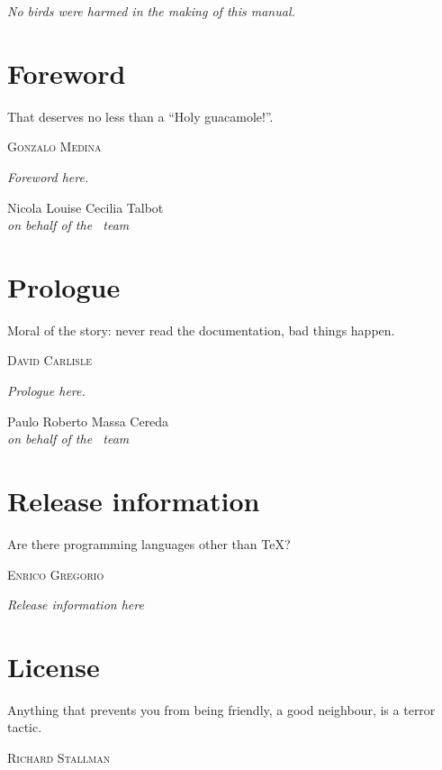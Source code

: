 \documentclass[a4paper,twoside,12pt]{memoir}
\begin{document}
\vspace*{25em}

\begin{flushright}
\em No birds were harmed in the making of this manual.
\end{flushright}

\chapter*{Foreword}
\label{chap:foreword}

\epigraph{That deserves no less than a ``Holy guacamole!''.}{\textsc{Gonzalo Medina}}

\emph{Foreword here.}

\vfill

\begin{flushright}
Nicola Louise Cecilia Talbot\\
\emph{on behalf of the \arara\ team}
\end{flushright}

\chapter*{Prologue}
\label{chap:prologue}

\epigraph{Moral of the story: never read the documentation, bad things happen.}{\textsc{David Carlisle}}

\emph{Prologue here.}

\vfill

\begin{flushright}
Paulo Roberto Massa Cereda\\
\emph{on behalf of the \arara\ team}
\end{flushright}

\chapter*{Release information}
\label{chap:releaseinformation}

\epigraph{Are there programming languages other than \TeX?}{\textsc{Enrico Gregorio}}

\emph{Release information here}

\chapter*{License}
\label{chap:license}

\epigraph{Anything that prevents you from being friendly, a good neighbour, is a terror tactic.}{\textsc{Richard Stallman}}
\end{document}
